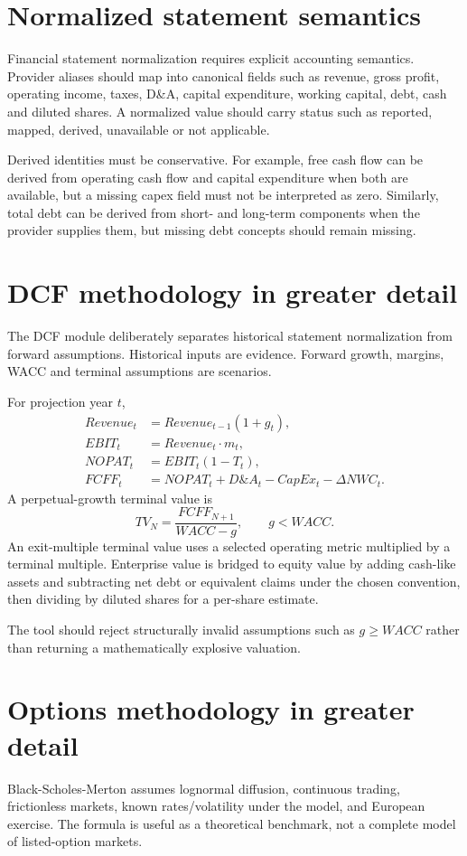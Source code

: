 \documentclass[11pt]{article}
\begin{document}
\section{Normalized statement semantics}
Financial statement normalization requires explicit accounting semantics. Provider aliases should map into canonical fields such as revenue, gross profit, operating income, taxes, D\&A, capital expenditure, working capital, debt, cash and diluted shares. A normalized value should carry status such as reported, mapped, derived, unavailable or not applicable.

Derived identities must be conservative. For example, free cash flow can be derived from operating cash flow and capital expenditure when both are available, but a missing capex field must not be interpreted as zero. Similarly, total debt can be derived from short- and long-term components when the provider supplies them, but missing debt concepts should remain missing.

\section{DCF methodology in greater detail}
The DCF module deliberately separates historical statement normalization from forward assumptions. Historical inputs are evidence. Forward growth, margins, WACC and terminal assumptions are scenarios.

For projection year $t$,
\begin{align}
Revenue_t &= Revenue_{t-1}(1+g_t),\\
EBIT_t &= Revenue_t\cdot m_t,\\
NOPAT_t &= EBIT_t(1-T_t),\\
FCFF_t &= NOPAT_t+D\&A_t-CapEx_t-\Delta NWC_t.
\end{align}
A perpetual-growth terminal value is
\begin{equation}
TV_N=\frac{FCFF_{N+1}}{WACC-g},\qquad g<WACC.
\end{equation}
An exit-multiple terminal value uses a selected operating metric multiplied by a terminal multiple. Enterprise value is bridged to equity value by adding cash-like assets and subtracting net debt or equivalent claims under the chosen convention, then dividing by diluted shares for a per-share estimate.

The tool should reject structurally invalid assumptions such as $g\ge WACC$ rather than returning a mathematically explosive valuation.

\section{Options methodology in greater detail}
Black-Scholes-Merton assumes lognormal diffusion, continuous trading, frictionless markets, known rates/volatility under the model, and European exercise. The formula is useful as a theoretical benchmark, not a complete model of listed-option markets.
\end{document}
